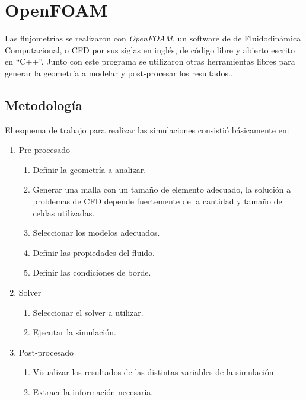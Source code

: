 \section{OpenFOAM}
%
Las flujometrías se realizaron con \emph{OpenFOAM}, un software de de
Fluidodinámica Computacional, o CFD por sus siglas en inglés, de código libre y
abierto escrito en ``C++''.
%
%
Junto con este programa se utilizaron otras herramientas libres para generar la
geometría a modelar y post-procesar los resultados..
%
\subsection{Metodología}
%
El esquema de trabajo para realizar las simulaciones consistió básicamente en:

\begin{enumerate}
    \item Pre-procesado
        \begin{enumerate}
            \item Definir la geometría a analizar.
            \item Generar una malla con un tamaño de elemento adecuado, la
                solución a problemas de CFD depende fuertemente de la cantidad
                y tamaño de celdas utilizadas.
            \item Seleccionar los modelos adecuados.
            \item Definir las propiedades del fluido.
            \item Definir las condiciones de borde.

        \end{enumerate}
    \item Solver
    \begin{enumerate} \item Seleccionar el solver a utilizar.
            \item Ejecutar la simulación.
    \end{enumerate}
\item Post-procesado
    \begin{enumerate}
        \item Visualizar los resultados de las distintas variables de la
            simulación.
        \item Extraer la información necesaria.
    \end{enumerate}
\end{enumerate}

